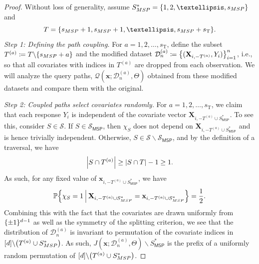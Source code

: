 \documentclass[10pt,a4paper]{amsart}
\DeclarePairedDelimiter{\abs}{|}{|}
\DeclarePairedDelimiter{\braces}{\lbrace}{\rbrace}
\DeclarePairedDelimiter{\paren}{(}{)}
\newcommand{\MSP}{\textsf{MSP}}
\newcommand{\bX}{\mathbf{X}}
\newcommand{\bx}{\mathbf{x}}
\newcommand{\cell}{\mathcal{C}}
\newcommand{\coordindices}{[\nfeats]}
\newcommand{\data}[1][n]{\mathcal{D}_{#1}}
\newcommand{\fcoefs}{\mathcal{S}}
\newcommand{\monomial}{\chi}
\newcommand{\nfeats}{d}
\newcommand{\nsamples}{n}
\newcommand{\querypath}{\mathcal{Q}}
\newcommand{\sparsity}{s}
\newcommand{\suppset}{S^*}
\newcommand{\traversalsize}{\sparsity_{\operatorname{T}}}
\newcommand{\traversal}{T}
\renewcommand{\P}{\mathbb{P}}
\begin{document}
\begin{proof}
    Without loss of generality, assume $\suppset_{\MSP} = \braces*{1,2,\ldots,\sparsity_{\MSP}}$ and
    \begin{equation}
        \traversal = \braces*{\sparsity_{\MSP}+1,\sparsity_{\MSP}+1,\ldots,\sparsity_{\MSP}+\traversalsize}.
    \end{equation}
    \textit{Step 1: Defining the path coupling.}
    For $a=1,2,\ldots,\traversalsize$, define the subset $\traversal^{(a)} \coloneqq \traversal\backslash\braces*{\sparsity_{\MSP}+a}$ and the modified dataset $\data^{(a)} \coloneqq \braces*{(\bX_{i,-\traversal^{(a)}},Y_i)}_{i=1}^\nsamples$, i.e., so that all covariates with indices in $\traversal^{(a)}$ are dropped from each observation.
    We will analyze the query paths, $\querypath(\bx;\data^{(a)},\Theta)$ obtained from these modified datasets and compare them with the original.

    \textit{Step 2: Coupled paths select covariates randomly.}
    For $a=1,2,\ldots,\traversalsize$, we claim that each response $Y_i$ is independent of the covariate vector $\bX_{i,-\traversal^{(a)}\cup\suppset_{\MSP}}$.
    To see this, consider $S \in \fcoefs$.
    If $S \in \fcoefs_{\MSP}$, then $\monomial_S$ does not depend on $\bX_{i,-\traversal^{(a)}\cup\suppset_{\MSP}}$ and is hence trivially independent.
    Otherwise, $S \in \fcoefs\backslash\fcoefs_{\MSP}$, and by the definition of a traversal, we have
    \begin{equation}
        \abs*{S\cap \traversal^{(a)}} \geq \abs*{S\cap\traversal} - 1 \geq 1.
    \end{equation}
    As such, for any fixed value of $\bx_{i,-\traversal^{(a)}\cup\suppset_{\MSP}}$, we have
    \begin{equation}
        \P\braces*{\monomial_S = 1 ~\vline~ \bX_{i,-\traversal^{(a)}\cup\suppset_{\MSP}} = \bx_{i,-\traversal^{(a)}\cup\suppset_{\MSP}}} = \frac{1}{2}.
    \end{equation}
    Combining this with the fact that the covariates are drawn uniformly from $\braces{\pm 1}^{\nfeats-1}$ as well as the symmetry of the splitting criterion, we see that the distribution of $\data^{(a)}$ is invariant to permutation of the covariate indices in $\coordindices\backslash\paren*{\traversal^{(a)}\cup\suppset_{\MSP}}$.
    As such, $J(\bx;\data^{(a)},\Theta)\backslash\suppset_{\MSP}$ is the prefix of a uniformly random permutation of $\coordindices\backslash\paren*{\traversal^{(a)}\cup\suppset_{\MSP}}$.


\end{proof}
\end{document}
